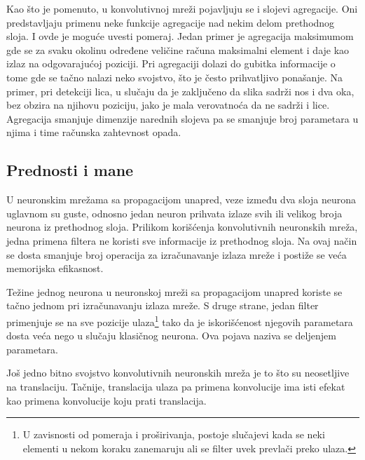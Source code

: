 \par 
Kao što je pomenuto, u konvolutivnoj mreži pojavljuju se i slojevi agregacije. Oni predstavljaju primenu neke funkcije agregacije nad nekim delom prethodnog sloja. I ovde je moguće uvesti pomeraj.  Jedan primer je agregacija maksimumom gde se za svaku okolinu određene veličine računa maksimalni element i daje kao izlaz na odgovarajućoj poziciji.  Pri agregaciji dolazi do gubitka informacije o tome gde se tačno nalazi neko svojstvo, što je često prihvatljivo ponašanje. Na primer, pri detekciji lica, u slučaju da je zaključeno da slika sadrži nos i dva oka, bez obzira na njihovu poziciju, jako je mala verovatnoća da ne sadrži i lice. Agregacija smanjuje dimenzije narednih slojeva pa se smanjuje broj parametara u njima i time računska zahtevnost opada. 

\subsection{Prednosti i mane}


U neuronskim mrežama sa propagacijom unapred, veze između dva sloja neurona uglavnom su guste, odnosno jedan neuron prihvata izlaze svih ili velikog broja neurona iz prethodnog sloja. Prilikom korišćenja konvolutivnih neuronskih mreža, jedna primena filtera ne koristi sve informacije iz prethodnog sloja. Na ovaj način se dosta smanjuje broj operacija za izračunavanje izlaza mreže i postiže se veća memorijska efikasnost.
\par 
Težine jednog neurona u neuronskoj mreži sa propagacijom unapred koriste se tačno jednom pri izračunavanju izlaza mreže. S druge strane, jedan filter primenjuje se na sve pozicije ulaza\footnote{U zavisnosti od pomeraja i proširivanja, postoje slučajevi kada se neki elementi u nekom koraku zanemaruju ali se filter uvek prevlači preko ulaza.} tako da je iskorišćenost njegovih parametara dosta veća nego u slučaju klasičnog neurona. Ova pojava naziva se deljenjem parametara.
\par Još jedno bitno svojstvo konvolutivnih neuronskih mreža je to što su neosetljive na translaciju. Tačnije, translacija ulaza pa primena konvolucije ima isti efekat kao primena konvolucije koju prati translacija.





